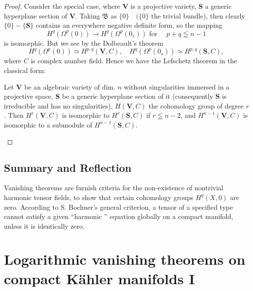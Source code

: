 \documentclass[lang=en,12pt]{beautybook}
\begin{document}
\begin{proof}
  Consider the special case, where $\boldsymbol{V}$ is a projective variety, $\boldsymbol{S}$ a generic hyperplane section of $\boldsymbol{V}$. Taking $\mathfrak{B}$ as $\{0\} \quad(\{0\}$ the trivial bundle), then clearly $\{0\}-\{\boldsymbol{S}\}$ contains an everywhere negative definite form, so the mapping
    \begin{equation*}
      H^q\left(\Omega^p(0)\right) \rightarrow H^q\left(\Omega^p\left(0_s\right)\right) \text { for } \quad p+q \leqq n-1
    \end{equation*}
    is isomorphic. But we see by the Dolbeault's theorem
    \begin{equation*}
      H^q\left(\Omega^p(0)\right) \simeq H^{p, q}(\boldsymbol{V}, C), \quad H^q\left(\Omega^p\left(0_s\right)\right) \simeq H^{p, q}(\boldsymbol{S}, C),
    \end{equation*}
    where $C$ is complex number field. Hence we have the Lefschetz theorem in the classical form:
  \begin{theorem}
    Let $\boldsymbol{V}$ be an algebraic variety of dim. $n$ without singularities immersed in a projective space, $\boldsymbol{S}$ be a generic hyperplane section of it (consequently $\boldsymbol{S}$ is irreducible and has no singularities), $H(\boldsymbol{V}, C)$ the cohomology group of degree $r$.
    Then $H^r(\boldsymbol{V}, C)$ is isomorphic to $H^r(\boldsymbol{S}, C)$ if $r \leqq n-2$, and $H^{n-1}(\boldsymbol{V}, C)$ is isomorphic to a submodule of $H^{n-1}(\boldsymbol{S}, C)$.
  \end{theorem}
\end{proof}

\section{Summary and Reflection}

Vanishing theorems are furnish criteria for the non-existence of nontrivial harmonic tensor fields, to show that certain cohomology groups $H^q(X, 0)$ are zero.
According to S. Bochner's general criterion, a tensor of a specified type cannot satisfy a given ``harmonic '' equation globally on a compact manifold, unless it is identically zero.







\chapter{Logarithmic vanishing theorems on compact K\"ahler manifolds I }
\end{document}
